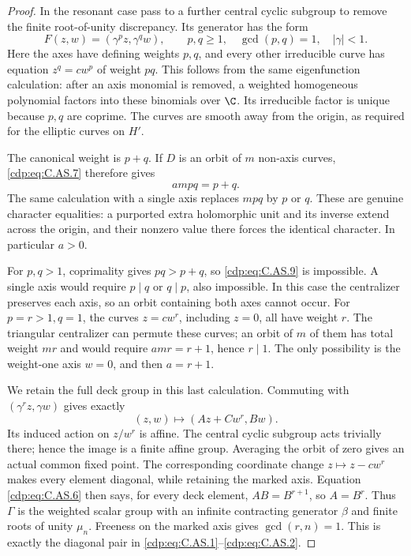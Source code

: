 \begin{proof}
In the resonant case pass to a further central cyclic
subgroup to remove the finite root-of-unity discrepancy.
Its generator has the form
\[
                 F(z,w)=(\gamma^p z,\gamma^q w),
       \qquad p,q\ge1,\quad\gcd(p,q)=1,\quad |\gamma|<1 .
                                                               \tag{C.AS.8}\label{cdp:eq:C.AS.8}
\]
Here the axes have defining weights $p,q$, and every
other irreducible curve has equation $z^q=cw^p$ of
weight $pq$. This follows from the same eigenfunction
calculation: after an axis monomial is removed, a
weighted homogeneous polynomial factors into these
binomials over $\C$. Its irreducible factor is unique
because $p,q$ are coprime. The curves are smooth away
from the origin, as required for the elliptic curves
on $H'$.

The canonical weight is $p+q$. If $D$ is an orbit of
$m$ non-axis curves, \eqref{cdp:eq:C.AS.7} therefore gives
\[
                              ampq=p+q.                 \tag{C.AS.9}\label{cdp:eq:C.AS.9}
\]
The same calculation with a single axis replaces $mpq$
by $p$ or $q$. These are genuine character equalities:
a purported extra holomorphic unit and its inverse
extend across the origin, and their nonzero value there
forces the identical character. In particular $a>0$.

For $p,q>1$, coprimality gives $pq>p+q$, so \eqref{cdp:eq:C.AS.9}
is impossible. A single axis would require $p\mid q$
or $q\mid p$, also impossible. In this case the
centralizer preserves each axis, so an orbit containing
both axes cannot occur. For $p=r>1,q=1$, the curves
$z=cw^r$, including $z=0$, all have weight $r$.
The triangular centralizer can permute these curves;
an orbit of $m$ of them has total weight $mr$ and
would require $amr=r+1$, hence $r\mid1$.
The only possibility is the weight-one axis $w=0$,
and then $a=r+1$.

We retain the full deck group in this last calculation.
Commuting with $(\gamma^rz,\gamma w)$ gives exactly
\[
              (z,w)\longmapsto(Az+Cw^r,Bw).             \tag{C.AS.10}\label{cdp:eq:C.AS.10}
\]
Its induced action on $z/w^r$ is affine. The central
cyclic subgroup acts trivially there; hence the image
is a finite affine group. Averaging the orbit of zero
gives an actual common fixed point. The corresponding
coordinate change $z\mapsto z-cw^r$ makes every element
diagonal, while retaining the marked axis. Equation
\eqref{cdp:eq:C.AS.6} then says, for every deck element,
$AB=B^{r+1}$, so $A=B^r$. Thus $\Gamma$ is the
weighted scalar group with an infinite contracting
generator $\beta$ and finite roots of unity
$\mu_n$. Freeness on the marked axis gives
$\gcd(r,n)=1$. This is exactly the diagonal pair in
\eqref{cdp:eq:C.AS.1}--\eqref{cdp:eq:C.AS.2}.


\end{proof}
